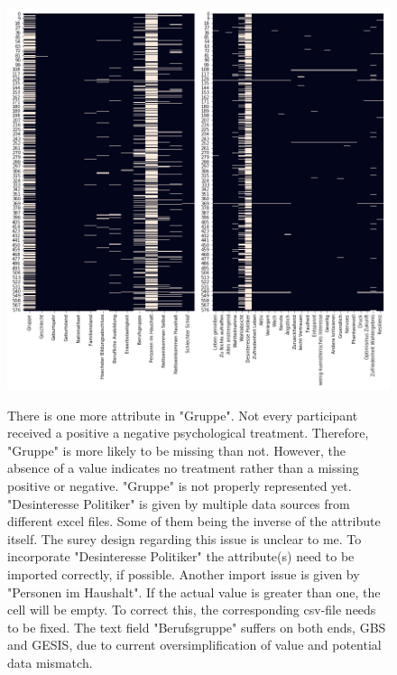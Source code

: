 \begin{appendices}
\begin{figure}[ht]
	\begin{center}
		\includegraphics[scale=0.50,angle=0]{fig/gbs_missing}
		\label{std}
		\caption{There is one more attribute in "Gruppe". Not every participant received a positive a negative psychological treatment. Therefore, "Gruppe" is more likely to be missing than not. However, the absence of a value indicates no treatment rather than a missing positive or negative. "Gruppe" is not properly represented yet. "Desinteresse Politiker" is given by multiple data sources from different excel files. Some of them being the inverse of the attribute itself. The surey design regarding this issue is unclear to me. To incorporate "Desinteresse Politiker" the attribute(s) need to be imported correctly, if possible. Another import issue is given by "Personen im Haushalt". If the actual value is greater than one, the cell will be empty. To correct this, the corresponding csv-file needs to be fixed. The text field "Berufsgruppe" suffers on both ends, GBS and GESIS, due to current oversimplification of value and potential data mismatch.}
	\end{center}
\end{figure}


\end{appendices}
